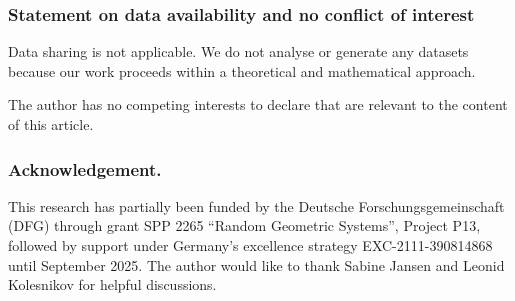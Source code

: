 \documentclass[reqno, 11pt]{amsart}
\theoremstyle{definition}
\begin{document}
\subsubsection*{Statement on data availability and no conflict of interest}

Data sharing is not applicable. 
We do not analyse or generate any datasets because our work proceeds within a theoretical and mathematical approach. 

The author has no competing interests to declare that are relevant to the content of this article.

\subsubsection*{Acknowledgement.}

This research has partially been funded by the Deutsche Forschungsgemeinschaft (DFG) through grant SPP 2265 ``Random Geometric Systems'', Project P13, followed by support under Germany’s excellence strategy EXC-2111-390814868 until September 2025. 
The author would like to thank Sabine Jansen and Leonid Kolesnikov for helpful discussions.
\end{document}

